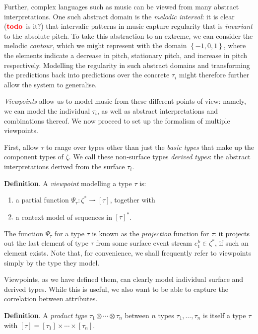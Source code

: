 \documentclass[12pt,a4paper,twoside,openright]{report}
\newcommand{\set}[1]{ \left\{ #1 \right\} }
\newcommand{\todo}{\textcolor{red}{\textbf{todo}~}}
\begin{document}
Further, complex languages such as music can be viewed from many abstract
interpretations. One such abstract domain is the \emph{melodic
interval}: it is clear (\todo is it?) that intervalic patterns in music capture
regularity that is \emph{invariant} to the absolute pitch. To take this
abstraction to an extreme, we can consider the melodic \emph{contour}, which we
might represent with the domain $\set{-1,0,1}$, where the elements indicate a
decrease in pitch, stationary pitch, and increase in pitch respectively.
Modelling the regularity in such abstract domains and transforming the
predictions back into predictions over the concrete $\tau_i$ might therefore
further allow the system to generalise.  

\emph{Viewpoints} allow us to model music from these different points of view:
namely, we can model the individual $\tau_i$, as well as abstract
interpretations and combinations thereof. We now proceed to set up the formalism
of multiple viewpoints.

First, allow $\tau$ to range over types other than just the \emph{basic types}
that make up the component types of $\zeta$. We call these non-surface types
\emph{derived types}: the abstract interpretations derived from the surface
$\tau_i$. 

\textbf{Definition}. A \emph{viewpoint} modelling a type $\tau$ is:
\begin{enumerate}[label=\arabic*., itemsep=0mm]
  \item a partial function $\Psi_\tau : \zeta^* \rightharpoonup [\tau]$,
    together with
  \item a context model of sequences in $[\tau]^*$.
\end{enumerate}

The function $\Psi_\tau$ for a type $\tau$ is known as the \emph{projection}
function for $\tau$: it projects out the last element of type $\tau$ from some
surface event stream $e_1^k \in \zeta^*$, if such an element exists. Note that,
for convenience, we shall frequently refer to viewpoints simply by the type they
model. 

Viewpoints, as we have defined them, can clearly model individual surface and
derived types. While this is useful, we also want to be able to capture the
correlation between attributes.

\textbf{Definition}. A \emph{product type} $\tau_1 \otimes \cdots \otimes
\tau_n$ between $n$ types $\tau_1, \ldots, \tau_n$ is itself a type $\tau$ with
$[\tau] = [\tau_1] \times \cdots \times [\tau_n]$. 
\end{document}
